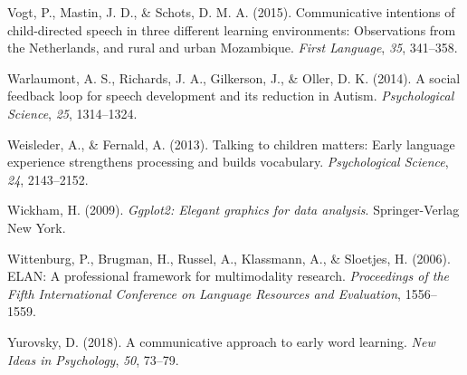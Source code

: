 \documentclass[floatsintext,man]{apa6}
\theoremstyle{definition}
\theoremstyle{definition}
\theoremstyle{definition}
\theoremstyle{remark}
\begin{document}
\hypertarget{ref-vogt2015communicative}{}
Vogt, P., Mastin, J. D., \& Schots, D. M. A. (2015). Communicative
intentions of child-directed speech in three different learning
environments: Observations from the Netherlands, and rural and urban
Mozambique. \emph{First Language}, \emph{35}, 341--358.

\hypertarget{ref-warlaumont2014social}{}
Warlaumont, A. S., Richards, J. A., Gilkerson, J., \& Oller, D. K.
(2014). A social feedback loop for speech development and its reduction
in Autism. \emph{Psychological Science}, \emph{25}, 1314--1324.

\hypertarget{ref-weisleder2013talking}{}
Weisleder, A., \& Fernald, A. (2013). Talking to children matters: Early
language experience strengthens processing and builds vocabulary.
\emph{Psychological Science}, \emph{24}, 2143--2152.

\hypertarget{ref-R-ggplot2}{}
Wickham, H. (2009). \emph{Ggplot2: Elegant graphics for data analysis}.
Springer-Verlag New York.

\hypertarget{ref-ELAN}{}
Wittenburg, P., Brugman, H., Russel, A., Klassmann, A., \& Sloetjes, H.
(2006). ELAN: A professional framework for multimodality research.
\emph{Proceedings of the Fifth International Conference on Language
Resources and Evaluation}, 1556--1559.

\hypertarget{ref-yurovsky2018communicative}{}
Yurovsky, D. (2018). A communicative approach to early word learning.
\emph{New Ideas in Psychology}, \emph{50}, 73--79.

\endgroup
\end{document}

